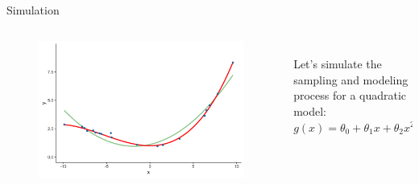 \documentclass[aspectratio=169]{../latex_main/tntbeamer}  %
\begin{document}
	\begin{frame}[c]{Simulation}
	  \begin{columns}
	      \begin{column}{.6\textwidth}
	           \begin{figure}
	               \includegraphics[scale=.5]{Bild10}
	           \end{figure} 
	      \end{column}
	      
	      \begin{column}{.4\textwidth}
	      \\
	      \bigskip
	      \bigskip
	      \bigskip
	            Let’s simulate the sampling and modeling process for a \alert{quadratic model}:\\
	            $g(x) = \theta_0 + \theta_1x + \theta_2x^2$
	      \end{column}
	  \end{columns}
	\end{frame}
	
\end{document}
